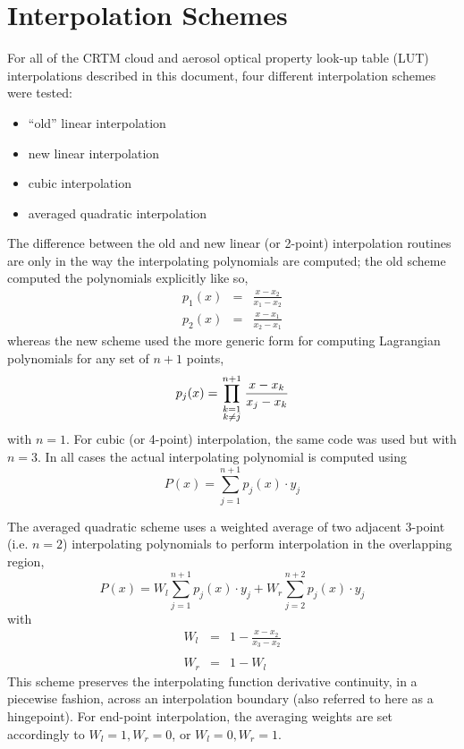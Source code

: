 \section{Interpolation Schemes}
For all of the CRTM cloud and aerosol optical property look-up table (LUT) interpolations described in this document, four different interpolation schemes were tested:
 \begin{itemize}
   \item{``old'' linear interpolation}
   \item{new linear interpolation}
   \item{cubic interpolation}
   \item{averaged quadratic interpolation}
 \end{itemize}
The difference between the old and new linear (or 2-point) interpolation routines are only in the way the interpolating polynomials are computed; the old scheme computed the polynomials explicitly like so,
\begin{eqnarray*}
  p_{1}(x) & = & \frac{x-x_{2}}{x_{1}-x_{2}} \\
  p_{2}(x) & = & \frac{x-x_{1}}{x_{2}-x_{1}}
\end{eqnarray*}
whereas the new scheme used the more generic form for computing Lagrangian polynomials for any set of $n+1$ points,
\begin{equation}
  p_{j}(x) = \prod_{\scriptstyle k=1 \atop \scriptstyle k \ne j}^{n+1}\frac{x-x_{k}}{x_{j}-x_{k}}
  \label{eqn:lagrangian_poly}
\end{equation}
with $n=1$. For cubic (or 4-point) interpolation, the same code was used but with $n=3$. In all cases the actual interpolating polynomial is computed using
\begin{equation}
  P(x) = \sum_{j=1}^{n+1} p_{j}(x)\cdot y_{j}
  \label{eqn:interpolating_poly}
\end{equation}

The averaged quadratic scheme\cite{Purser_AvgQuad_Interpolation} uses a weighted average of two adjacent 3-point (i.e. $n=2$) interpolating polynomials to perform interpolation in the overlapping region,
\begin{equation}
  P(x) = W_{l}\sum_{j=1}^{n+1} p_{j}(x)\cdot y_{j} + W_{r}\sum_{j=2}^{n+2} p_{j}(x)\cdot y_{j}
  \label{eqn:avgquad_poly}
\end{equation}
with
\begin{eqnarray*}
  W_{l} & = & 1 - \frac{x-x_{2}}{x_{3}-x_{2}}\\
   & & \\
  W_{r} & = & 1 - W_{l}
\end{eqnarray*}
This scheme preserves the interpolating function derivative continuity, in a piecewise fashion, across an interpolation boundary (also referred to here as a hingepoint). For end-point interpolation, the averaging weights are set accordingly to $W_{l}=1,W_{r}=0$, or $W_{l}=0,W_{r}=1$.


